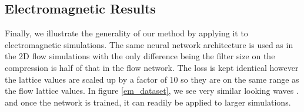 \documentclass{article}
\begin{document}
\subsection{Electromagnetic Results}

Finally, we illustrate the generality of our method by applying it to electromagnetic simulations. The same neural network architecture is used as in the 2D flow simulations with the only difference being the filter size on the compression is half of that in the flow network. The loss is kept identical however the lattice values are scaled up by a factor of 10 so they are on the same range as the flow lattice values. In figure \ref{em_dataset}, we see very similar looking waves . and once the network is trained, it can readily be applied to larger simulations.

\begin{figure}[!t]
\centering
{}

\end{figure}
\end{document}

